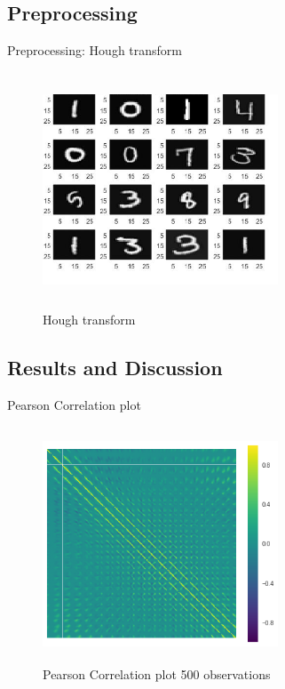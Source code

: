 \documentclass{beamer}
\theoremstyle{plain}
\theoremstyle{definition}
\theoremstyle{plain}
\theoremstyle{plain}
\begin{document}
\subsection{Preprocessing}
\begin{frame}{Preprocessing: Hough transform}

\begin{figure}[h!]
\begin{center}
\includegraphics[width= 7cm, height =7cm]{./Figures/4_2.png}
\caption {Hough transform}
\label{4_2} 
\end{center}
\end{figure}

\end{frame}
\subsection{Results and Discussion}
\begin{frame}{Pearson Correlation plot}
\begin{figure}[h!]
\begin{center}
\includegraphics[width= 7cm, height =7cm]{./Figures/4_3.png}
\caption {Pearson Correlation plot 500 observations}
\label{4_3} 
\end{center}
\end{figure}
\end{frame}
\end{document}
